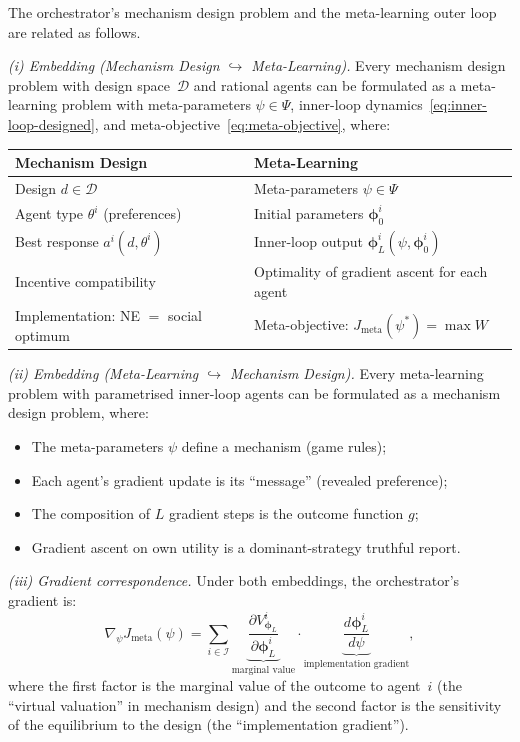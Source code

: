 \begin{theorem}\label{thm:md-ml-iso}
The orchestrator's mechanism design problem and the meta-learning outer loop are related as follows.

\medskip\noindent\emph{(i) Embedding (Mechanism Design $\hookrightarrow$ Meta-Learning).} Every mechanism design problem with design space~$\mathcal{D}$ and rational agents can be formulated as a meta-learning problem with meta-parameters $\psi\in\Psi$, inner-loop dynamics~\eqref{eq:inner-loop-designed}, and meta-objective~\eqref{eq:meta-objective}, where:
\begin{center}
\renewcommand{\arraystretch}{1.3}
\begin{tabular}{ll}
\textbf{Mechanism Design} & \textbf{Meta-Learning} \\
\hline
Design $d \in \mathcal{D}$ & Meta-parameters $\psi \in \Psi$ \\
Agent type $\theta^i$ (preferences) & Initial parameters $\bm{\phi}_0^i$ \\
Best response $a^i(d, \theta^i)$ & Inner-loop output $\bm{\phi}_L^i(\psi, \bm{\phi}_0^i)$ \\
Incentive compatibility & Optimality of gradient ascent for each agent \\
Implementation: NE $=$ social optimum & Meta-objective: $J_{\mathrm{meta}}(\psi^*) = \max W$ \\
\end{tabular}
\end{center}

\medskip\noindent\emph{(ii) Embedding (Meta-Learning $\hookrightarrow$ Mechanism Design).} Every meta-learning problem with parametrised inner-loop agents can be formulated as a mechanism design problem, where:
\begin{itemize}
  \item The meta-parameters $\psi$ define a mechanism (game rules);
  \item Each agent's gradient update is its ``message'' (revealed preference);
  \item The composition of $L$ gradient steps is the outcome function $g$;
  \item Gradient ascent on own utility is a dominant-strategy truthful report.
\end{itemize}

\medskip\noindent\emph{(iii) Gradient correspondence.} Under both embeddings, the orchestrator's gradient is:
\begin{equation}\label{eq:mechanism-gradient}
  \nabla_\psi J_{\mathrm{meta}}(\psi) = \sum_{i\in\mathcal{I}} \underbrace{\frac{\partial V^i_{\bm{\phi}_L}}{\partial \bm{\phi}_L^i}}_{\text{marginal value}} \cdot \underbrace{\frac{d\bm{\phi}_L^i}{d\psi}}_{\text{implementation gradient}},
\end{equation}
where the first factor is the marginal value of the outcome to agent~$i$ (the ``virtual valuation'' in mechanism design) and the second factor is the sensitivity of the equilibrium to the design (the ``implementation gradient'').
\end{theorem}

